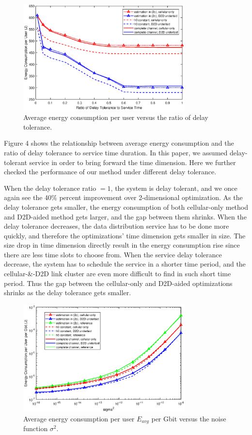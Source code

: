 \documentclass{ieeeaccess}
\begin{document}
\begin{figure} [htb]
\includegraphics*[width=8.8cm]{delays.eps}
\caption{Average energy consumption per user versus the ratio of delay tolerance.} \label{fig:5}
\end{figure}

Figure 4 shows the relationship between average energy consumption and the ratio of delay tolerance to service time duration. In this paper, we assumed delay-tolerant service in order to bring forward the time dimension. Here we further checked the performance of our method under different delay tolerance.

When the delay tolerance ratio $= 1$, the system is delay tolerant, and we once again see the 40\% percent improvement over 2-dimensional optimization. As the delay tolerance gets smaller, the energy consumption of both cellular-only method and D2D-aided method gets larger, and the gap between them shrinks. When the delay tolerance decreases, the data distribution service has to be done more quickly, and therefore the optimizations' time dimension gets smaller in size. The size drop in time dimension directly result in the energy consumption rise since there are less time slots to choose from. When the service delay tolerance decrease, the system has to schedule the service in a shorter time period, and the cellular-\&-D2D link cluster are even more difficult to find in such short time period. Thus the gap between the cellular-only and D2D-aided optimizations shrinks as the delay tolerance gets smaller.

\begin{figure} [htb]
\includegraphics*[width=8.8cm]{sigma2s.eps}
\caption{Average energy consumption per user $E_{avg}$ per Gbit versus the noise function ${\sigma ^2}$.}\label{fig:2}
\end{figure}
\end{document}
